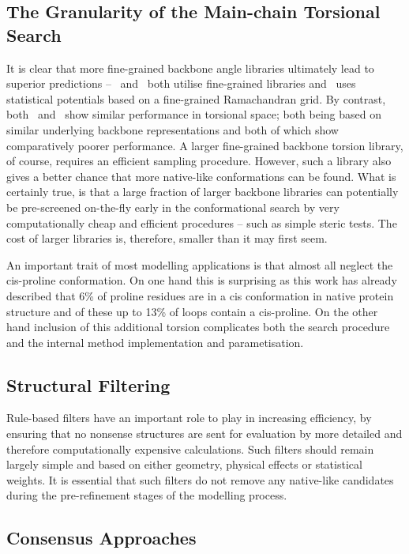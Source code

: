 \subsection{The Granularity of the Main-chain Torsional Search}
 
It is clear that more fine-grained backbone angle libraries ultimately lead to superior predictions -- \rapper\ and \plop\ both utilise fine-grained libraries and \modloop\ uses statistical potentials based on a fine-grained Ramachandran grid. By contrast, both \prearcus\ and \petra\ show similar performance in torsional space; both being based on similar underlying backbone representations and both of which show comparatively poorer performance.
A larger fine-grained backbone torsion library, of course, requires an efficient sampling procedure. However, such a  library also gives a better chance that more native-like conformations can be found.  What is certainly true, is that a large fraction of larger backbone libraries can potentially be pre-screened on-the-fly early in the conformational search by very computationally cheap and efficient procedures -- such as simple steric tests.
The
cost of larger libraries is, therefore, smaller than it may first seem.

An important trait of most modelling applications is that almost all neglect the cis-proline conformation.
On one hand this is surprising as this work has already described that 6\% of proline residues are in a cis conformation in native protein structure and of these up to 13\% of loops contain a cis-proline.  On the other hand inclusion of this additional torsion complicates both the search procedure and the internal method implementation and parametisation.

\subsection{Structural Filtering}

Rule-based filters have an important role to play in increasing efficiency, by ensuring that no nonsense structures
are sent for evaluation by more detailed and therefore computationally expensive calculations.
Such filters should remain largely simple and based on either geometry, physical effects or statistical weights. It is essential that such filters do not remove any native-like candidates during the pre-refinement stages of the modelling process.

\subsection{ Consensus Approaches}

